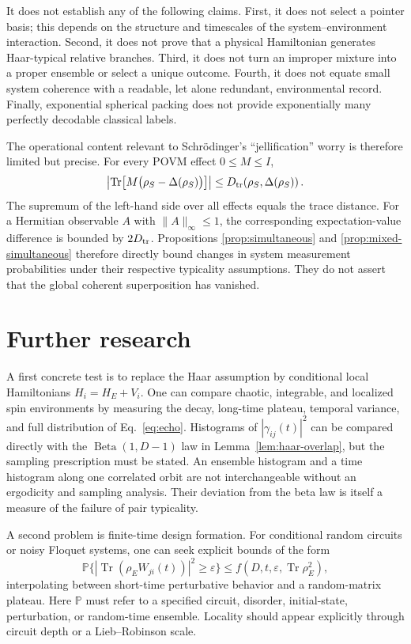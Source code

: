 \documentclass[aps,pra,reprint,superscriptaddress,nofootinbib,longbibliography]{revtex4-2}
\newcommand{\Tr}{\operatorname{Tr}}
\newcommand{\eps}{\varepsilon}
\newcommand{\PP}{\mathbb{P}}
\begin{document}
It does not establish any of the following claims.
First, it does not select a pointer basis; this depends on the structure and
timescales of the system--environment interaction.  Second, it does not prove
that a physical Hamiltonian generates Haar-typical relative branches.  Third,
it does not turn an improper mixture into a proper ensemble or select a unique
outcome.  Fourth, it does not equate small system coherence with a readable,
let alone redundant, environmental record.  Finally, exponential spherical
packing does not provide exponentially many perfectly decodable classical
labels.

The operational content relevant to Schr\"odinger's ``jellification'' worry is
therefore limited but precise.  For every POVM effect $0\leq M\leq I$,
\begin{equation}
 \left|\Tr\!\left[M\bigl(\rho_S-\Delta(\rho_S)\bigr)\right]\right|
 \leq D_{\rm tr}\!\left(\rho_S,\Delta(\rho_S)\right).
 \label{eq:povm-operational}
\end{equation}
The supremum of the left-hand side over all effects equals the trace distance.
For a Hermitian observable $A$ with $\|A\|_\infty\leq1$, the corresponding
expectation-value difference is bounded by $2D_{\rm tr}$.  Propositions
\ref{prop:simultaneous} and \ref{prop:mixed-simultaneous} therefore directly
bound changes in system measurement probabilities under their respective
typicality assumptions.  They do not assert that the global coherent
superposition has vanished.

\section{Further research}

A first concrete test is to replace the Haar assumption by conditional local
Hamiltonians $H_i=H_E+V_i$.  One can compare chaotic, integrable, and localized
spin environments by measuring the decay, long-time plateau, temporal
variance, and full distribution of Eq.~\eqref{eq:echo}.  Histograms of
$|\gamma_{ij}(t)|^2$ can be compared directly with the
$\operatorname{Beta}(1,D-1)$ law in
Lemma~\ref{lem:haar-overlap}, but the sampling prescription must be stated.
An ensemble histogram and a time histogram along one correlated orbit are not
interchangeable without an ergodicity and sampling analysis.  Their deviation
from the beta law is itself a measure of the failure of pair typicality.

A second problem is finite-time design formation.  For conditional random
circuits or noisy Floquet systems, one can seek explicit bounds of the form
\begin{equation}
 \PP\{|\Tr(\rho_EW_{ji}(t))|^2\geq\eps\}
 \leq f(D,t,\eps,\Tr\rho_E^2),
\end{equation}
interpolating between short-time perturbative behavior and a random-matrix
plateau.  Here $\PP$ must refer to a specified circuit, disorder,
initial-state, perturbation, or random-time ensemble.  Locality should appear
explicitly through circuit depth or a Lieb--Robinson scale.
\end{document}
